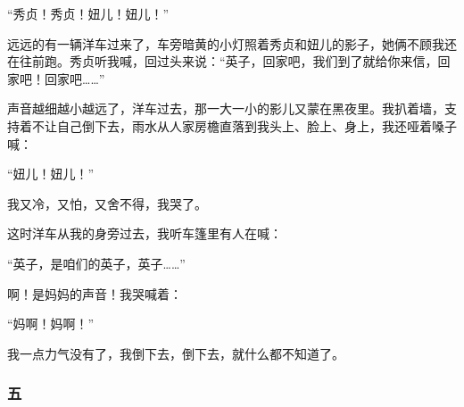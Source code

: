 \par “秀贞！秀贞！妞儿！妞儿！”
\par 远远的有一辆洋车过来了，车旁暗黄的小灯照着秀贞和妞儿的影子，她俩不顾我还在往前跑。秀贞听我喊，回过头来说：“英子，回家吧，我们到了就给你来信，回家吧！回家吧……”
\par 声音越细越小越远了，洋车过去，那一大一小的影儿又蒙在黑夜里。我扒着墙，支持着不让自己倒下去，雨水从人家房檐直落到我头上、脸上、身上，我还哑着嗓子喊：
\par “妞儿！妞儿！”
\par 我又冷，又怕，又舍不得，我哭了。
\par 这时洋车从我的身旁过去，我听车篷里有人在喊：
\par “英子，是咱们的英子，英子……”
\par 啊！是妈妈的声音！我哭喊着：
\par “妈啊！妈啊！”
\par 我一点力气没有了，我倒下去，倒下去，就什么都不知道了。



\subsubsection*{五}


